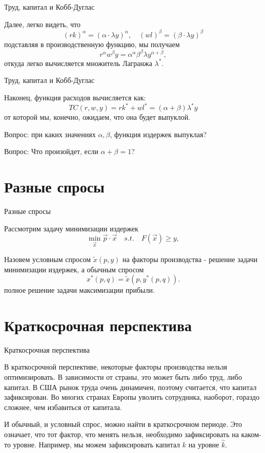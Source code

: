 \documentclass{beamer}
\begin{document}
\begin{frame}{Труд, капитал и Кобб-Дуглас}

Далее, легко видеть, что 
$$(r k)^{\alpha} = (\alpha \cdot \lambda y)^{\alpha}, \quad (w l)^{\beta} = (\beta \cdot \lambda y)^{\beta}$$
подставляя в производственную функцию, мы получаем
$$ r^{\alpha}w^{\beta} y = \alpha^{\alpha} \beta^{\beta} \lambda y^{\alpha + \beta},$$
откуда легко вычисляется множитель Лагранжа $\lambda^{\ast}$.

\end{frame}

\begin{frame}{Труд, капитал и Кобб-Дуглас}

Наконец, функция расходов вычисляется как:
$$ TC(r,w,y) = r k^{\ast} + w l^{\ast} = (\alpha + \beta) \lambda^{\ast} y$$
от которой мы, конечно, ожидаем, что она будет выпуклой.

Вопрос: при каких значениях $\alpha, \beta$, функция издержек выпуклая? 

Вопрос: Что произойдет, если $\alpha + \beta = 1$?

\end{frame}

\section{Разные спросы}

\begin{frame}{Разные спросы}

Рассмотрим задачу минимизации издержек
$$ \min_{\vec x} \vec p \cdot \vec x \quad s.t. \quad F(\vec x) \geqslant y,$$

\begin{definition}
Назовем условным спросом $\tilde x(p, y)$ на факторы производства - решение задачи минимизации издержек, а обычным спросом
$$x^{\ast}(p, q) = \tilde x(p, y^{\ast}(p, q)).$$
полное решение задачи максимизации прибыли.
\end{definition}

\end{frame}

\section{Краткосрочная перспектива}

\begin{frame}{Краткосрочная перспектива}

В краткосрочной перспективе, некоторые факторы производства нельзя оптимизировать. В зависимости от страны, это может быть либо труд, либо капитал. В США рынок труда очень динамичен, поэтому считается, что капитал зафиксирован. Во многих странах Европы уволить сотрудника, наоборот, гораздо сложнее, чем избавиться от капитала. 

И обычный, и условный спрос, можно найти в краткосрочном периоде. Это означает, что тот фактор, что менять нельзя, необходимо зафиксировать на каком-то уровне. Например, мы можем зафиксировать капитал $k$ на уровне $\hat k$.

\end{frame}
\end{document}
